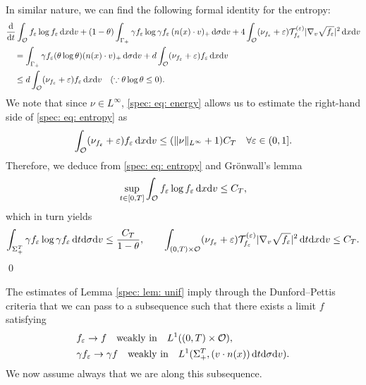 \documentclass[10pt, reqno]{amsart}
\theoremstyle{plain}
\theoremstyle{definition}
\theoremstyle{remark}
\renewenvironment{proof}[1][\proofname]{\noindent{\scshape #1.\quad}}{\qed}
\numberwithin{equation}{section}
\newcommand{\calO}{\mathcal O}
\newcommand{\calT}{\mathcal T}
\newcommand{\ve}{\varepsilon}
\newcommand{\dx}{\textnormal{d}x}
\newcommand{\dv}{\textnormal{d}v}
\newcommand{\dt}{\textnormal{d}t}
\newcommand{\ddt}{\frac{\textnormal{d}}{\textnormal{d}t}}
\newcommand{\tnd}{\textnormal{d}}
\begin{document}
\begin{proof}
    In similar nature, we can find the following formal identity for the entropy:
    \begin{equation} \label{spec: eq: entropy}
    \begin{split}
        &\ddt \int_{\calO} f_\ve \log f_\ve \,\dx\dv + (1 - \theta) \int_{\Gamma_+} \gamma f_\ve \log \gamma f_\ve \,(n(x)\cdot v)_+ \,\tnd\sigma\dv   + 4 \int_{\calO} (\nu_{f_\ve} + \ve) \calT_{f_\ve}^{(\ve)} |\nabla_v \sqrt{f_\ve}|^2 \,\dx\dv \\
        &\quad = \int_{\Gamma_+} \gamma f_\ve (\theta \log \theta) (n(x)\cdot v)_+ \,\tnd\sigma\dv +  d \int_{\calO} (\nu_{f_\ve} + \ve) f_\ve \,\dx\dv \\
        &\quad \le  d \int_{\calO} (\nu_{f_\ve} + \ve) f_\ve \,\dx\dv \quad (\because \theta \log \theta \le 0).
    \end{split}
    \end{equation}
    We note that since $\nu\in L^\infty$, \eqref{spec: eq: energy} allows us to estimate the right-hand side of \eqref{spec: eq: entropy} as
    \begin{align*}
        \int_{\calO} (\nu_{f_\ve} + \ve) f_\ve\,\dx\dv \le (\|\nu\|_{L^\infty} + 1) C_T \quad \forall \ve\in (0,1].
    \end{align*}
    Therefore, we deduce from \eqref{spec: eq: entropy} and Gr\"onwall's lemma
    \begin{align*}
        \sup_{t\in [0,T]} \int_{\calO} f_\ve \log f_\ve \,\dx\dv \le C_T,
    \end{align*}
    which in turn yields
    \begin{align*}
        \int_{\Sigma_+^T} \gamma f_\ve \log \gamma f_\ve \,\dt\tnd\sigma\dv \le \frac{C_T}{1-\theta}, \qquad \int_{(0,T)\times\calO} (\nu_{f_\ve} + \ve) \calT_{f_\ve}^{(\ve)}|\nabla_v \sqrt{f_\ve}|^2 \,\dt\dx\dv \le C_T.
    \end{align*}
\end{proof}

The estimates of Lemma \ref{spec: lem: unif} imply through the Dunford--Pettis criteria that we can pass to a subsequence such that there exists a limit $f$ satisfying
\begin{align*}
    &f_\ve \to f \quad \text{weakly in} \quad L^1((0,T)\times\calO), \\
    &\gamma f_\ve \to \gamma f \quad \text{weakly in}\quad L^1(\Sigma_+^T, (v\cdot n(x))\,\dt\tnd\sigma\dv).
\end{align*}
We now assume always that we are along this subsequence.
\end{document}
